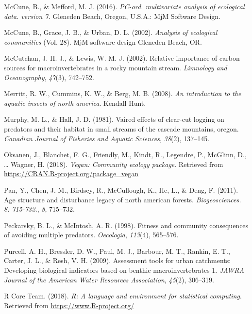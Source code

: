 \documentclass[double,12pt]{beavtex}
\begin{document}
  \hypertarget{ref-PC-ORD}{}
  McCune, B., \& Mefford, M. J. (2016). \emph{PC-ord. multivariate
  analysis of ecological data. version 7.} Gleneden Beach, Oregon, U.S.A.:
  MjM Software Design.
  
  \hypertarget{ref-McCune2002}{}
  McCune, B., Grace, J. B., \& Urban, D. L. (2002). \emph{Analysis of
  ecological communities} (Vol. 28). MjM software design Gleneden Beach,
  OR.
  
  \hypertarget{ref-McCutchan2002}{}
  McCutchan, J. H. J., \& Lewis, W. M. J. (2002). Relative importance of
  carbon sources for macroinvertebrates in a rocky mountain stream.
  \emph{Limnology and Oceanography}, \emph{47}(3), 742--752.
  
  \hypertarget{ref-Merritt2008}{}
  Merritt, R. W., Cummins, K. W., \& Berg, M. B. (2008). \emph{An
  introduction to the aquatic insects of north america}. Kendall Hunt.
  
  \hypertarget{ref-Murphy1981}{}
  Murphy, M. L., \& Hall, J. D. (1981). Vaired effects of clear-cut
  logging on predators and their habitat in small streams of the cascade
  mountains, oregon. \emph{Canadian Journal of Fisheries and Aquatic
  Sciences}, \emph{38}(2), 137--145.
  
  \hypertarget{ref-vegan}{}
  Oksanen, J., Blanchet, F. G., Friendly, M., Kindt, R., Legendre, P.,
  McGlinn, D., \ldots{} Wagner, H. (2018). \emph{Vegan: Community ecology
  package}. Retrieved from \url{https://CRAN.R-project.org/package=vegan}
  
  \hypertarget{ref-Pan2011}{}
  Pan, Y., Chen, J. M., Birdsey, R., McCullough, K., He, L., \& Deng, F.
  (2011). Age structure and disturbance legacy of north american forests.
  \emph{Biogeosciences. 8: 715-732.}, \emph{8}, 715--732.
  
  \hypertarget{ref-Peckarsky1998}{}
  Peckarsky, B. L., \& McIntosh, A. R. (1998). Fitness and community
  consequences of avoiding multiple predators. \emph{Oecologia},
  \emph{113}(4), 565--576.
  
  \hypertarget{ref-Purcell2009}{}
  Purcell, A. H., Bressler, D. W., Paul, M. J., Barbour, M. T., Rankin, E.
  T., Carter, J. L., \& Resh, V. H. (2009). Assessment tools for urban
  catchments: Developing biological indicators based on benthic
  macroinvertebrates 1. \emph{JAWRA Journal of the American Water
  Resources Association}, \emph{45}(2), 306--319.
  
  \hypertarget{ref-R-base}{}
  R Core Team. (2018). \emph{R: A language and environment for statistical
  computing}. Retrieved from \url{https://www.R-project.org/}
  
\end{document}

